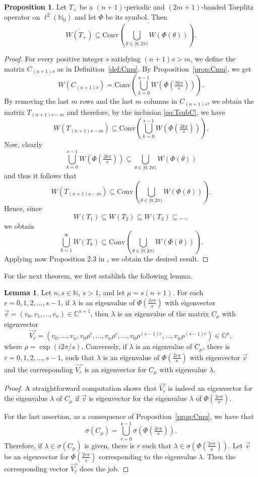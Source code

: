 \documentclass[12pt,reqno]{amsart}
\theoremstyle{definition}
\newtheorem{lemma}[theorem]{Lemma}
\newtheorem{proposition}[theorem]{Proposition}
\newcommand{\ovl}[1]{\overline{#1}}	%
\newcommand{\parn}[1]{\left( #1 \right)}%
\newcommand{\conv}[1]{\mathrm{Conv}\parn{#1}}	%
\newcommand{\Vr}{\overrightarrow{V_r}}
\newcommand{\C}{{\mathbb{C}}}
\newcommand{\N}{{\mathbb{N}}}
\begin{document}
 \begin{proposition}
Let $T_+$ be a $(n+1)$-periodic and $(2m+1)$-banded Toeplitz operator on $\ell^2(\N_0)$ and let $\Phi$ be its symbol. Then
\[
\ovl{W(T_+)}
   \subseteq \ovl{\conv{  \bigcup_{\theta\in[0,2\pi)}W(\Phi(\theta))}}.
   \]
 \end{proposition}
 \begin{proof}
 For every positive integer $s$ satisfying $(n+1)s >m$, we define the matrix $C_{(n+1)s}$ as in Definition~\ref{def:Cmu}. By Proposition~\ref{prop:Cmu}, we get 
\[
W(C_{(n+1)s})=\conv{ \bigcup_{k=0}^{s-1} W\left(\Phi\left(\tfrac{2k\pi}{s}\right)\right)}.
\]
By removing the last $m$ rows and the last $m$ columns in $C_{(n+1)s}$, we obtain  the matrix $T_{(n+1)s-m}$ and therefore, by the inclusion \eqref{eq:TsubC}, we have
 \[
 W(T_{(n+1)s -m}) \subseteq 
 \conv{ \bigcup_{k=0}^{s-1} W\left(\Phi\left(\tfrac{2k\pi}{s}\right)\right)}.
\]
Now, clearly
\[
\bigcup_{k=0}^{s-1} W\left(\Phi\left(\tfrac{2k\pi}{s}\right)\right) \subseteq 
\bigcup_{\theta\in[0,2\pi)}W(\Phi(\theta))
 \]
and thus it follows that 
\[W(T_{(n+1)s -m }) \subseteq 
\conv{  \bigcup_{\theta\in[0,2\pi)}W(\Phi(\theta))}.
\]
 Hence, since
\[
 W(T_1) \subseteq W(T_2) \subseteq W(T_3) \subseteq \dots,
 \]
 we obtain  
 \[
 \bigcup_{k=1}^{\infty} W(T_k) \subseteq 
 \conv{  \bigcup_{\theta\in[0,2\pi)}W(\Phi(\theta))}.
\]
Applying now Proposition 2.3 in \cite{IM}, we obtain the desired result. 
\end{proof}

For the next theorem, we first establish the following lemma.

\begin{lemma}\label{le:eigenvalues}
Let $n, s \in {\mathbb N}$, $s>1$, and let $\mu=s(n+1)$. For each $r=0, 1, 2, \dots, s-1$, if $\lambda$ is an
 eigenvalue of $\Phi(\tfrac{2 r \pi}{s})$ with eigenvector $\vec{v}=(v_0,v_1,\ldots,v_n) \in {\mathbb C}^{n+1}$, then $\lambda$ is an eigenvalue of the matrix $C_{\mu}$ with eigenvector
\[
\Vr=(v_0, \dots, v_n, v_0 \rho^r, \dots, v_n \rho^r, \dots, v_0 \rho^{(s-1)r}, \dots, v_n \rho^{(s-1)r}) \in \C^{\mu},
\]
where $\rho=\exp(i 2\pi/s)$. Conversely, if $\lambda$ is an eigenvalue of $C_{\mu}$, there is  $r=0, 1, 2, \dots, s-1$, such that $\lambda$ is an eigenvalue of $\Phi(\tfrac{2 r \pi}{s})$ with eigenvector $\vec{v}$ and the corresponding $\Vr$ is an eigenvector for $C_\mu$ with eigenvalue $\lambda$.
 \end{lemma}
\begin{proof}
A straightforward computation shows that $\Vr$ is indeed an eigenvector for the eigenvalue $\lambda$ of 
$C_{\mu}$ if $\vec{v}$ is eigenvector for the eigenvalue $\lambda$ of  $\Phi(\tfrac{2 r \pi}{s})$. 
    
For the last assertion, as a consequence of Proposition~\ref{prop:Cmu}, we have that
  \[
    \sigma(C_{\mu})=\bigcup_{r=0}^{s-1}\sigma\left(\Phi\left(\tfrac{2 r \pi}{s}\right)\right).
    \]
    Therefore, if $\lambda \in \sigma(C_{\mu})$ is given, there is $r$ such that $\lambda\in\sigma\left(\Phi(\tfrac{2r \pi}{s})\right)$. Let $\vec{v}$ be an eigenvector for $\Phi(\tfrac{2 r \pi}{s})$ corresponding to the eigenvalue $\lambda$. Then the corresponding vector $\Vr$ does the job.  
 \end{proof}
\end{document}

